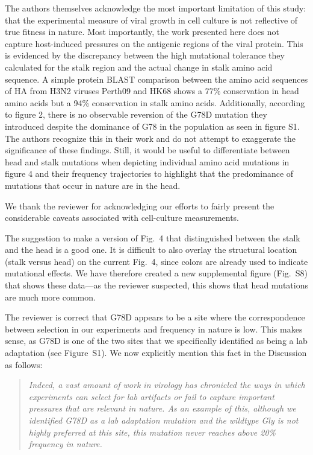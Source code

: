 \documentclass[11pt, oneside]{article}   	%
\newcommand{\response}[1]{{\color{black}#1}}
\begin{document}
The authors themselves acknowledge the most important limitation of this study: that the experimental measure of viral growth in cell culture is not reflective of true fitness in nature. Most importantly, the work presented here does not capture host-induced pressures on the antigenic regions of the viral protein. This is evidenced by the discrepancy between the high mutational tolerance they calculated for the stalk region and the actual change in stalk amino acid sequence. A simple protein BLAST comparison between the amino acid sequences of HA from H3N2 viruses Perth09 and HK68 shows a 77\% conservation in head amino acids but a 94\% conservation in stalk amino acids. Additionally, according to figure 2, there is no observable reversion of the G78D mutation they introduced despite the dominance of G78 in the population as seen in figure S1. The authors recognize this in their work and do not attempt to exaggerate the significance of these findings. Still, it would be useful to differentiate between head and stalk mutations when depicting individual amino acid mutations in figure 4 and their frequency trajectories to highlight that the predominance of mutations that occur in nature are in the head. 

\response{We thank the reviewer for acknowledging our efforts to fairly present the considerable caveats associated with cell-culture measurements.

The suggestion to make a version of Fig.~4 that distinguished between the stalk and the head is a good one.
It is difficult to also overlay the structural location (stalk versus head) on the current Fig.~4, since colors are already used to indicate mutational effects.
We have therefore created a new supplemental figure (Fig.~S8) that shows these data---as the reviewer suspected, this shows that head mutations are much more common.

The reviewer is correct that G78D appears to be a site where the correspondence between selection in our experiments and frequency in nature is low.
This makes sense, as G78D is one of the two sites that we specifically identified as being a lab adaptation (see Figure~S1).
We now explicitly mention this fact in the Discussion as follows:

\begin{quote}
\textsl{Indeed, a vast amount of work in virology has chronicled the ways in which experiments can select for lab artifacts or fail to capture important pressures that are relevant in nature.
As an example of this, although we identified G78D as a lab adaptation mutation and the wildtype Gly is not highly preferred at this site, this mutation never reaches above 20\% frequency in nature. }
\end{quote}
} 
\end{document}
